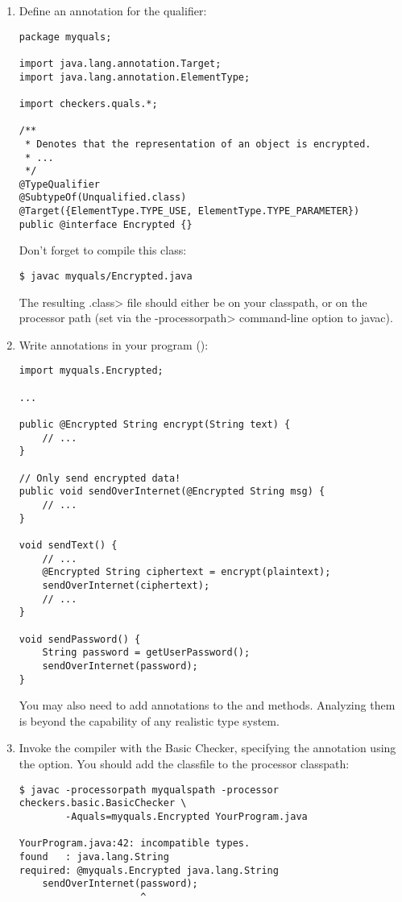 \begin{enumerate}
\item
 Define an annotation for the  qualifier:

\begin{Verbatim}
package myquals;

import java.lang.annotation.Target;
import java.lang.annotation.ElementType;

import checkers.quals.*;

/**
 * Denotes that the representation of an object is encrypted.
 * ...
 */
@TypeQualifier
@SubtypeOf(Unqualified.class)
@Target({ElementType.TYPE_USE, ElementType.TYPE_PARAMETER})
public @interface Encrypted {}
\end{Verbatim}

Don't forget to compile this class:

\begin{Verbatim}
$ javac myquals/Encrypted.java
\end{Verbatim}

The resulting \<.class> file should either be on your classpath, or on the
processor path (set via the \<-processorpath> command-line option to javac).

\item 
  Write  annotations in your program ():

\begin{Verbatim}
import myquals.Encrypted;

...

public @Encrypted String encrypt(String text) {
    // ...
}

// Only send encrypted data!
public void sendOverInternet(@Encrypted String msg) {
    // ...
}

void sendText() {
    // ...
    @Encrypted String ciphertext = encrypt(plaintext);
    sendOverInternet(ciphertext);
    // ...
}

void sendPassword() {
    String password = getUserPassword();
    sendOverInternet(password);
}
\end{Verbatim}

You may also need to add  annotations to the
 and  methods.  Analyzing them is beyond the
capability of any realistic type system.

\item
  Invoke the compiler with the Basic Checker, specifying the
   annotation using the  option.
  You should add the  classfile to the processor classpath:

\begin{Verbatim}
$ javac -processorpath myqualspath -processor checkers.basic.BasicChecker \
        -Aquals=myquals.Encrypted YourProgram.java

YourProgram.java:42: incompatible types.
found   : java.lang.String
required: @myquals.Encrypted java.lang.String
    sendOverInternet(password);
                     ^
\end{Verbatim}

\end{enumerate}


